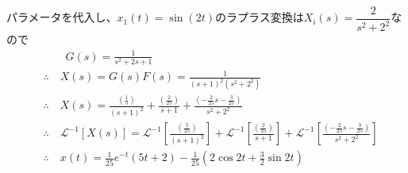 \documentclass[a4paper,12pt]{article}
\begin{document}
\begin{tcolorbox}[title={4. (7)\(m=1,d=2,k_1=1,k_2=1\)とし、入力変位\(x_1(t)=\sin(2t)\)を与えたときの応
\indent \quad 答を求めよ。 }]
パラメータを代入し、\(x_1(t)=\sin(2t)\)のラプラス変換は\(X_i(s)=\dfrac{2}{s^2+2^2}\)なので
    \vspace{-4mm}
    \begin{align*}
        &\qquad G(s) = \frac{1}{s^2 + 2s+ 1} \\
        &\therefore \quad X(s) = G(s) F(s) = \frac{1}{(s+1)^2(s^2+2^2)} \\
        &\therefore \quad X(s) =  \frac{\left(\frac{1}{5}\right)}{(s+1)^2} 
        + \frac{\left(\frac{2}{25}\right)}{s+1}
        + \frac{\left(-\frac{2}{25}s-\frac{3}{25}\right)}{s^2+2^2}\\
        &\therefore \quad \mathcal{L}^{-1} \left[ X(s)\right] 
        = \mathcal{L}^{-1} \left[\frac{\left(\frac{5}{25}\right)}{(s+1)^2}  \right]
        + \mathcal{L}^{-1} \left[\frac{\left(\frac{2}{25}\right)}{s+1} \right]
        + \mathcal{L}^{-1} \left[\frac{\left(-\frac{2}{25}s-\frac{3}{25}\right)}{s^2+2^2}\right]  \\
        &\therefore \quad x(t) = \frac{1}{25}e^{-t}(5t+2)- \frac{1}{25}\left(2\cos 2t + \frac{3}{2}\sin 2t\right)
    \end{align*}
\end{tcolorbox}


\newpage
\end{document}
